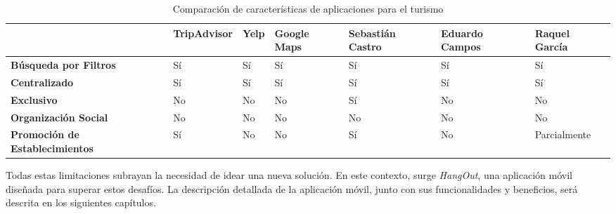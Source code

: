\begin{landscape}
    \begin{table}
        \centering
        \caption{Comparación de características de aplicaciones para el turismo}
        \label{tab:comparison}
        \small
        \begin{tabularx}{\linewidth}{|X|X|X|X|X|X|X|}
            \hline
                                                   & \textbf{TripAdvisor} & \textbf{Yelp} & \textbf{Google Maps} & \textbf{Sebastián Castro} & \textbf{Eduardo Campos} & \textbf{Raquel García} \\ \hline
            \textbf{Búsqueda por Filtros}          & Sí                   & Sí            & Sí                   & Sí                        & Sí                      & Sí                     \\ \hline
            \textbf{Centralizado}                  & Sí                   & Sí            & Sí                   & Sí                        & Sí                      & Sí                     \\ \hline
            \textbf{Exclusivo}                     & No                   & No            & No                   & Sí                        & No                      & No                     \\ \hline
            \textbf{Organización Social}           & No                   & No            & No                   & No                        & No                      & No                     \\ \hline
            \textbf{Promoción de Establecimientos} & Sí                   & No            & No                   & Sí                        & No                      & Parcialmente           \\ \hline
        \end{tabularx}
    \end{table}
\end{landscape}

Todas estas limitaciones subrayan la necesidad de idear una nueva solución. En este contexto, surge \textit{HangOut}, una aplicación móvil diseñada para superar estos desafíos. La descripción detallada de la aplicación móvil, junto con sus funcionalidades y beneficios, será descrita en los siguientes capítulos.




